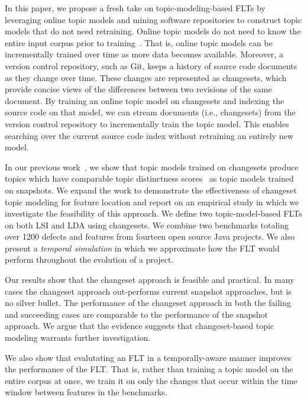 In this paper, we propose a fresh take on topic-modeling-based FLTs by leveraging online topic models and mining software repositories to construct topic models that do not need retraining.
Online topic models do not need to know the entire input corpus prior to training~\cite{Hoffman-etal:2010,Radim:2011}.
That is, online topic models can be incrementally trained over time as more data becomes available.
Moreover, a version control repository, such as Git, keeps a history of source code documents as they change over time.
These changes are represented as changesets, which provide concise views of the differences between two revisions of the same document.
By training an online topic model on changesets and indexing the source code on that model, we can stream documents (i.e., changesets) from the version control repository to incrementally train the topic model.
This enables searching over the current source code index without retraining an entirely new model.

In our previous work~\cite{Corley-etal:2014}, we show that topic models trained on changesets produce topics which have comparable
topic distinctness scores~\cite{Thomas-etal:2011} as topic models trained on snapshots.
We expand the work to demonstrate the effectiveness of changeset topic modeling for feature location and report on an empirical study in which we investigate the feasibility of this approach.
We define two topic-model-based FLTs on both LSI and LDA using changesets.
We combine two benchmarks totaling over 1200 defects and features from fourteen open source Java projects.
We also present a \emph{temporal simulation} in which we approximate how the FLT would perform throughout the evolution of a project.

Our results show that the changeset approach is feasible and practical.
In many cases the changeset approach out-performs current snapshot approaches, but is no silver bullet.
The performance of the changeset approach in both the failing and succeeding cases are comparable to the performance of the snapshot approach.
We argue that the evidence suggests that changeset-based topic modeling warrants further investigation.

We also show that evalutating an FLT in a temporally-aware manner improves the performance of the FLT.
That is, rather than training a topic model on the entire corpus at once,
we train it on only the changes that occur within the time window between features in the benchmarks.

